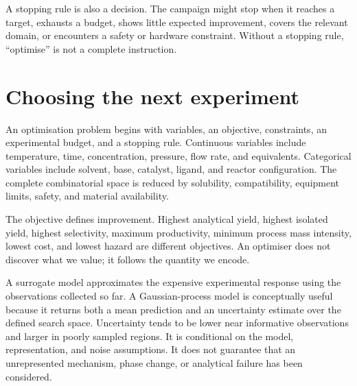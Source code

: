 
A stopping rule is also a decision.
The campaign might stop when it reaches a target, exhausts a budget, shows little expected improvement, covers the relevant domain, or encounters a safety or hardware constraint.
Without a stopping rule, ``optimise'' is not a complete instruction.

\section{Choosing the next experiment}

An optimisation problem begins with variables, an objective, constraints, an experimental budget, and a stopping rule.
Continuous variables include temperature, time, concentration, pressure, flow rate, and equivalents.
Categorical variables include solvent, base, catalyst, ligand, and reactor configuration.
The complete combinatorial space is reduced by solubility, compatibility, equipment limits, safety, and material availability.

The objective defines improvement.
Highest analytical yield, highest isolated yield, highest selectivity, maximum productivity, minimum process mass intensity, lowest cost, and lowest hazard are different objectives.
An optimiser does not discover what we value; it follows the quantity we encode.


A surrogate model approximates the expensive experimental response using the observations collected so far.
A Gaussian-process model is conceptually useful because it returns both a mean prediction and an uncertainty estimate over the defined search space.
Uncertainty tends to be lower near informative observations and larger in poorly sampled regions.
It is conditional on the model, representation, and noise assumptions.
It does not guarantee that an unrepresented mechanism, phase change, or analytical failure has been considered.

